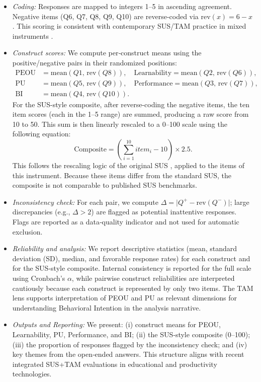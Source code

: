 \documentclass[english]{UNISINOSartigo} %
\begin{document}
\begin{itemize}
\item \textit{Coding:} Responses are mapped to integers 1–5 in ascending agreement. Negative items (Q6, Q7, Q8, Q9, Q10) are reverse‐coded via $\mathrm{rev}(x)=6-x$. This scoring is consistent with contemporary SUS/TAM practice in mixed instruments \cite{robertson2020discount}.

\item \textit{Construct scores:} We compute per‐construct means using the positive/negative pairs in their randomized positions:
\[
\begin{aligned}
\mathrm{PEOU}&=\mathrm{mean}(Q1,\,\mathrm{rev}(Q8)),\quad
\mathrm{Learnability}=\mathrm{mean}(Q2,\,\mathrm{rev}(Q6)),\\
\mathrm{PU}&=\mathrm{mean}(Q5,\,\mathrm{rev}(Q9)),\quad
\mathrm{Performance}=\mathrm{mean}(Q3,\,\mathrm{rev}(Q7)),\\
\mathrm{BI}&=\mathrm{mean}(Q4,\,\mathrm{rev}(Q10)).
\end{aligned}
\]
For the SUS-style composite, after reverse-coding the negative items, the ten item scores (each in the 1--5 range) are summed, producing a raw score from 10 to 50. This sum is then linearly rescaled to a 0--100 scale using the following equation:
\[
\mathrm{Composite} = \left(\sum_{i=1}^{10} item_i - 10\right) \times 2.5.
\]
This follows the rescaling logic of the original SUS \cite{brooke1996sus}, applied to the items of this instrument. Because these items differ from the standard SUS, the composite is not comparable to published SUS benchmarks.

\item \textit{Inconsistency check:} For each pair, we compute $\Delta=\lvert Q^{+}-\mathrm{rev}(Q^{-})\rvert$; large discrepancies (e.g., $\Delta>2$) are flagged as potential inattentive responses. Flags are reported as a data‐quality indicator and not used for automatic exclusion.

\item \textit{Reliability and analysis:} We report descriptive statistics (mean, standard deviation (SD), median, and favorable response rates) for each construct and for the SUS-style composite. Internal consistency is reported for the full scale using Cronbach’s $\alpha$, while pairwise construct reliabilities are interpreted cautiously because each construct is represented by only two items. The TAM lens supports interpretation of PEOU and PU as relevant dimensions for understanding Behavioral Intention in the analysis narrative.

\item \textit{Outputs and Reporting:} We present: (i) construct means for PEOU, Learnability, PU, Performance, and BI; (ii) the SUS‐style composite (0–100); (iii) the proportion of responses flagged by the inconsistency check; and (iv) key themes from the open‐ended answers. This structure aligns with recent integrated SUS+TAM evaluations in educational and productivity technologies.
\end{itemize}
\end{document}
